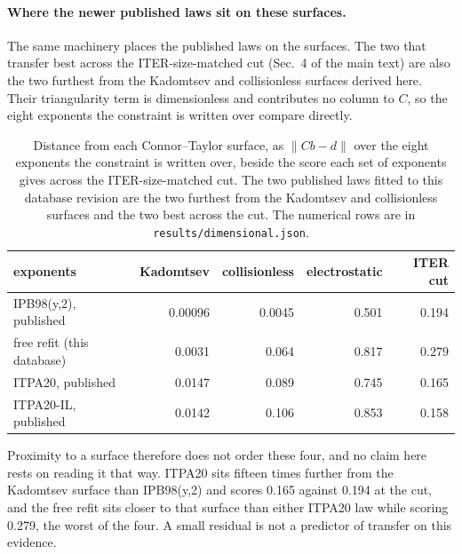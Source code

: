 \documentclass[12pt,letterpaper]{article}
\begin{document}
\paragraph{Where the newer published laws sit on these surfaces.} The same
machinery places the published laws on the surfaces. The two that transfer best
across the ITER-size-matched cut (Sec.~4 of the main text) are also the two
furthest from the Kadomtsev and collisionless surfaces derived here. Their
triangularity
term is dimensionless and contributes no column to $C$, so the eight exponents
the constraint is written over compare directly.

\begin{table}[!ht]
\centering
\small
\caption{Distance from each Connor--Taylor surface, as
$\lVert Cb-d\rVert$ over the eight exponents the constraint is written over,
beside the score each set of exponents gives across the ITER-size-matched cut.
The two published laws fitted to this database revision are the two furthest
from the Kadomtsev and collisionless surfaces and the two best across the cut. The numerical rows are in
\texttt{results/dimensional.json}.}
\label{tab:surfacedistance}
\begin{tabular}{lrrrr}
\toprule
exponents & Kadomtsev & collisionless & electrostatic & ITER cut \\
\midrule
IPB98(y,2), published      & 0.00096 & 0.0045 & 0.501 & 0.194 \\
free refit (this database) & 0.0031 & 0.064 & 0.817 & 0.279 \\
ITPA20, published          & 0.0147 & 0.089 & 0.745 & 0.165 \\
ITPA20-IL, published       & 0.0142 & 0.106 & 0.853 & 0.158 \\
\bottomrule
\end{tabular}
\par\smallskip{}
\end{table}

Proximity to a surface therefore does not order these four, and no claim here
rests on reading it that way. ITPA20 sits fifteen times further from the
Kadomtsev surface than IPB98(y,2) and scores 0.165 against 0.194 at the cut, and
the free refit sits closer to that surface than either ITPA20 law while scoring
0.279, the worst of the four. A small residual is not a predictor of transfer on
this evidence.
\end{document}
